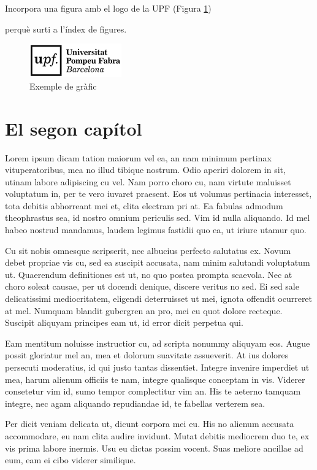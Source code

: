 \documentclass[12pt, a4paper,twoside]{tesi_upf}
\begin{document}
Incorpora una figura amb el logo de la UPF (Figura \ref{fig:logo}) {perquè surti a l'índex de figures. 
\begin{figure}[h]
  \centering
  \includegraphics[scale=0.5]{logo_upf.png}
    \caption{Exemple de gràfic}
    \label{fig:logo}
\end{figure}


\chapter{El segon capítol}

Lorem ipsum dicam tation maiorum vel ea, an nam minimum pertinax vituperatoribus, mea no illud tibique nostrum. Odio aperiri dolorem in sit, utinam labore adipiscing cu vel. Nam porro choro cu, nam virtute maluisset voluptatum in, per te vero iuvaret praesent. Eos ut volumus pertinacia interesset, tota debitis abhorreant mei et, clita electram pri at. Ea fabulas admodum theophrastus sea, id nostro omnium periculis sed. Vim id nulla aliquando. Id mel habeo nostrud mandamus, laudem legimus fastidii quo ea, ut iriure utamur quo.

Cu sit nobis omnesque scripserit, nec albucius perfecto salutatus ex. Novum debet propriae vis cu, sed ea suscipit accusata, nam minim salutandi voluptatum ut. Quaerendum definitiones est ut, no quo postea prompta scaevola. Nec at choro soleat causae, per ut docendi denique, discere veritus no sed. Ei sed sale delicatissimi mediocritatem, eligendi deterruisset ut mei, ignota offendit ocurreret at mel. Numquam blandit gubergren an pro, mei cu quot dolore recteque. Suscipit aliquyam principes eam ut, id error dicit perpetua qui.

Eam mentitum noluisse instructior cu, ad scripta nonummy aliquyam eos. Augue possit gloriatur mel an, mea et dolorum suavitate assueverit. At ius dolores persecuti moderatius, id qui justo tantas dissentiet. Integre invenire imperdiet ut mea, harum alienum officiis te nam, integre qualisque conceptam in vis. Viderer consetetur vim id, sumo tempor complectitur vim an. His te aeterno tamquam integre, nec agam aliquando repudiandae id, te fabellas verterem sea.

Per dicit veniam delicata ut, dicunt corpora mei eu. His no alienum accusata accommodare, eu nam clita audire invidunt. Mutat debitis mediocrem duo te, ex vis prima labore inermis. Usu eu dictas possim vocent. Suas meliore ancillae ad eum, eam ei cibo viderer similique.

}
\end{document}
